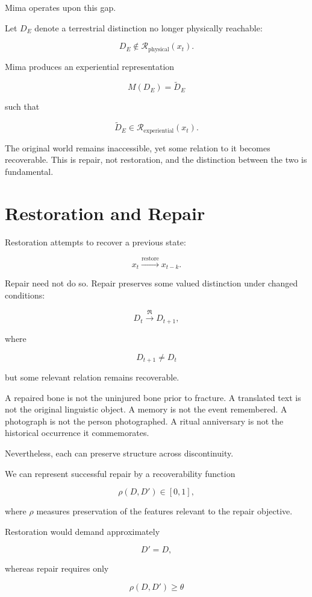 \documentclass[11pt,oneside]{book}
\theoremstyle{definition}
\theoremstyle{remark}
\newcommand{\R}{\mathcal{R}}
\newcommand{\Repair}{\mathfrak{R}}
\begin{document}
Mima operates upon this gap.

Let \(D_E\) denote a terrestrial distinction no longer physically reachable:

\[
D_E\notin\R_{\mathrm{physical}}(x_t).
\]

Mima produces an experiential representation

\[
M(D_E)=\widetilde D_E
\]

such that

\[
\widetilde D_E\in\R_{\mathrm{experiential}}(x_t).
\]

The original world remains inaccessible, yet some relation to it becomes recoverable. This is repair, not restoration, and the distinction between the two is fundamental.

\section{Restoration and Repair}

Restoration attempts to recover a previous state:

\[
x_t\xrightarrow{\mathrm{restore}}x_{t-k}.
\]

Repair need not do so. Repair preserves some valued distinction under changed conditions:

\[
D_t\xrightarrow{\Repair}D_{t+1},
\]

where

\[
D_{t+1}\neq D_t
\]

but some relevant relation remains recoverable.

A repaired bone is not the uninjured bone prior to fracture. A translated text is not the original linguistic object. A memory is not the event remembered. A photograph is not the person photographed. A ritual anniversary is not the historical occurrence it commemorates.

Nevertheless, each can preserve structure across discontinuity.

We can represent successful repair by a recoverability function

\[
\rho(D,D')
\in[0,1],
\]

where \(\rho\) measures preservation of the features relevant to the repair objective.

Restoration would demand approximately

\[
D'=D,
\]

whereas repair requires only

\[
\rho(D,D')\geq\theta
\]
\end{document}
